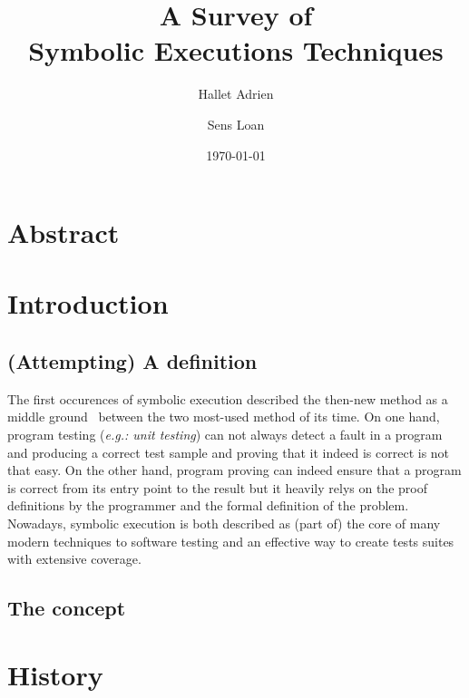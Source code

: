 \documentclass[11pt]{article}
\begin{document}
\title{A Survey of\\Symbolic Executions Techniques} %
\author{Hallet Adrien \and Sens Loan}
\date{\today}
\maketitle

  \section*{Abstract}

  \section{Introduction}
    \subsection{(Attempting) A definition}
      The first occurences of symbolic execution described the then-new method as a middle ground~\cite{newapproach} between the two most-used method of its time. On one hand, program testing (\emph{e.g.: unit testing}) can not always detect a fault in a program and producing a correct test sample and proving that it indeed is correct is not that easy. On the other hand, program proving can indeed ensure that a program is correct from its entry point to the result but it heavily relys on the proof definitions by the programmer and the formal definition of the problem.\\
      Nowadays, symbolic execution is both described as (part of) the core of many modern techniques to software testing\cite{chopper:icse18} and an effective way to create tests suites with extensive coverage.\cite{threedecadeslater}
    \subsection{The concept}

  \section{History}
\end{document}
